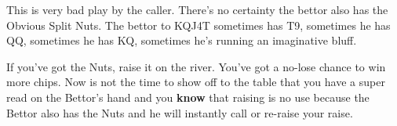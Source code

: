 This is very bad play by the caller. There's no certainty the bettor also has
the Obvious Split Nuts. The bettor to KQJ4T sometimes has T9, sometimes
he has QQ, sometimes he has KQ, sometimes he's running an imaginative
bluff.

If you've got the Nuts, raise it on the river. You've got a no-lose
chance to win more chips. Now is not the time to show off to the table
that you have a super read on the Bettor's hand and you \textbf{know}
that raising is no use because the Bettor also has the Nuts and he will
instantly call or re-raise your raise.








